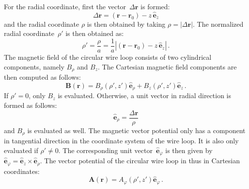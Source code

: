 For the radial coordinate, first the vector~$\Delta \mathbf{r}$ is formed:
\begin{equation}
  \Delta \mathbf{r} = (\mathbf{r} - \mathbf{r}_0) - z \, \hat{\mathbf{e}}_z
\end{equation}
and the radial coordinate $\rho$ is then obtained by taking $\rho = |\Delta \mathbf{r}|$.
The normalized radial coordinate~$\rho'$ is then obtained as:
\begin{equation}
  \rho' = \frac{\rho}{a} = \frac{1}{a} |(\mathbf{r} - \mathbf{r}_0) - z \, \hat{\mathbf{e}}_z| \, .
\end{equation}
The magnetic field of the circular wire loop consists of two cylindrical components, namely $B_\rho$ and $B_z$.
The Cartesian magnetic field components are then computed as follows:
\begin{equation}
  \mathbf{B}(\mathbf{r}) = B_\rho(\rho', z') \hat{\mathbf{e}}_\rho + B_z(\rho', z') \hat{\mathbf{e}}_z \, .
\end{equation}
If $\rho' = 0$, only $B_z$ is evaluated.
Otherwise, a unit vector in radial direction is formed as follows:
\begin{equation}
  \hat{\mathbf{e}}_\rho = \frac{\Delta \mathbf{r}}{\rho}
\end{equation}
and $B_\rho$ is evaluated as well.
The magnetic vector potential only has a component in tangential direction in the coordinate system of the wire loop.
It is also only evaluated if $\rho' \neq 0$.
The corresponding unit vector~$\hat{\mathbf{e}}_\varphi$ is then given by
$\hat{\mathbf{e}}_\varphi = \hat{\mathbf{e}}_z \times \hat{\mathbf{e}}_\rho$.
The vector potential of the circular wire loop in thus in Cartesian coordinates:
\begin{equation}
  \mathbf{A}(\mathbf{r}) = A_\varphi(\rho', z') \hat{\mathbf{e}}_\varphi \, .
\end{equation}

